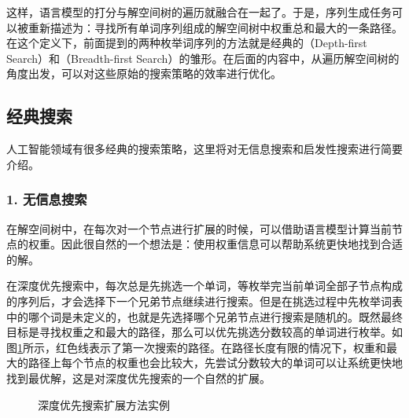 \parinterval 这样，语言模型的打分与解空间树的遍历就融合在一起了。于是，序列生成任务可以被重新描述为：寻找所有单词序列组成的解空间树中权重总和最大的一条路径。在这个定义下，前面提到的两种枚举词序列的方法就是经典的{\small{}}（Depth-first Search）和{\small{}}（Breadth-first Search）的雏形。在后面的内容中，从遍历解空间树的角度出发，可以对这些原始的搜索策略的效率进行优化。


\subsection{经典搜索}

\parinterval 人工智能领域有很多经典的搜索策略，这里将对无信息搜索和启发性搜索进行简要介绍。


\subsubsection{1. 无信息搜索}

\parinterval 在解空间树中，在每次对一个节点进行扩展的时候，可以借助语言模型计算当前节点的权重。因此很自然的一个想法是：使用权重信息可以帮助系统更快地找到合适的解。

\parinterval 在深度优先搜索中，每次总是先挑选一个单词，等枚举完当前单词全部子节点构成的序列后，才会选择下一个兄弟节点继续进行搜索。但是在挑选过程中先枚举词表中的哪个词是未定义的，也就是先选择哪个兄弟节点进行搜索是随机的。既然最终目标是寻找权重之和最大的路径，那么可以优先挑选分数较高的单词进行枚举。如图\ref{fig:2-15}所示，红色线表示了第一次搜索的路径。在路径长度有限的情况下，权重和最大的路径上每个节点的权重也会比较大，先尝试分数较大的单词可以让系统更快地找到最优解，这是对深度优先搜索的一个自然的扩展。

\begin{figure}[htp]
    \centering
 	
	\caption{深度优先搜索扩展方法实例}
    \label{fig:2-15}
\end{figure}

